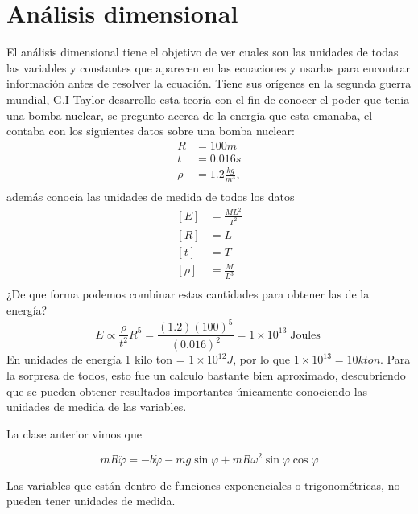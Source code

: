 \section{Análisis dimensional}

\begin{tcolorbox}[colback=Black!4, colframe=White, title=¿Qué es el analisis dimensional?, coltitle=Black]
  El análisis dimensional tiene el objetivo de ver cuales son las unidades de todas las variables y constantes que aparecen en las ecuaciones y usarlas para encontrar información antes de resolver la ecuación.
  Tiene sus orígenes en la segunda guerra mundial, G.I Taylor desarrollo esta teoría con el fin de conocer el poder que tenia una bomba nuclear, se pregunto acerca de la energía que esta emanaba, el contaba con los siguientes datos sobre una bomba nuclear:
  $$
  \begin{aligned}
  R &= 100m \\
  t &= 0.016s \\
  \rho &= 1.2 \frac{kg}{m^3}, \\
\end{aligned}
  $$ además conocía las unidades de medida de todos los datos
  $$\begin{aligned}
    [E] &= \frac{ML^2}{T^2} \\
    [R] &= L \\
    [t] &=  T \\
    [\rho] &= \frac{M}{L^3} \\  
  \end{aligned}$$
  ¿De que forma podemos combinar estas cantidades para obtener las de la energía?
   $$
    E \propto \frac{\rho}{t^2}R^{5}=\frac{(1.2)(100)^{5}}{(0.016)^2} = 1 \times 10^{13} \operatorname{Joules}
  $$                                                           
En unidades de energía 1 kilo ton = $1 \times 10^{12}J$, por lo que $1 \times  10 ^{13} = 10kton$. Para la sorpresa de todos, esto fue un calculo bastante bien aproximado, descubriendo que se pueden obtener resultados importantes únicamente conociendo las unidades de medida de las variables.  
\end{tcolorbox}

La clase anterior vimos que 

\begin{equation}\label{1}
    mR \ddot{{\varphi}} = -b \dot{{\varphi}} - mg \sin\varphi + mR \omega^2 \sin\varphi \cos\varphi    
\end{equation}

\begin{tcolorbox}[colback=Black!4,colframe=White] 
\begin{nota}
  Las variables que están dentro de funciones exponenciales o trigonométricas, no pueden tener unidades de medida.
\end{nota}
\end{tcolorbox}

